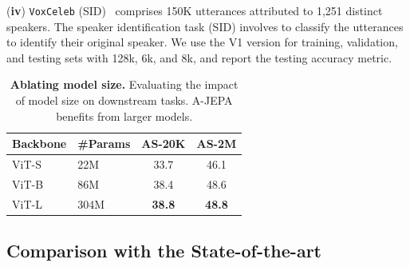\documentclass{article}
\begin{document}
\noindent
(\textbf{iv}) \texttt{VoxCeleb} (SID)~\cite{Nagrani2020VoxcelebLS} comprises 150K utterances attributed to 1,251 distinct speakers. 
The speaker identification task (SID) involves to classify the utterances to identify their original speaker. 
We use the V1 version for training, validation, and testing sets with 128k, 6k, and 8k, and report the testing accuracy metric.





\begin{table}[t!]
\centering
\begin{tabular}{llcc}

                    \textbf{Backbone} & \textbf{\#Params} & \textbf{AS-20K} & \textbf{AS-2M}  \\
                \midrule
               ViT-S &  22M & 33.7 & 46.1  \\ 
                 ViT-B & 86M &38.4 &48.6 \\
                 ViT-L & 304M & \textbf{38.8} & \textbf{48.8}  \\
                 
            \end{tabular}
    \caption{\textbf{Ablating model size.} Evaluating the impact of model size on downstream tasks. A-JEPA benefits from larger models.}
    \label{tab:ablation:model_size}
\end{table}  




\subsection{Comparison with the State-of-the-art}
\end{document}
